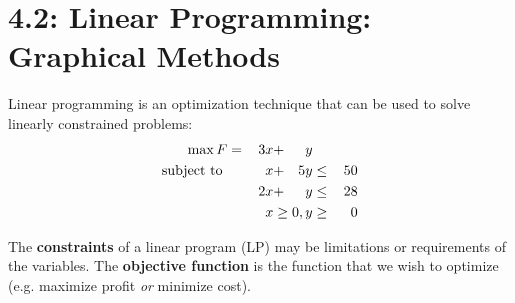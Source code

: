 \documentclass[../mathNotesPreamble]{subfiles}
\begin{document}
  \section{4.2: Linear Programming: Graphical Methods}
    \begin{defn*}
      Linear programming is an optimization technique that can be used to solve linearly constrained problems:
      \begin{alignat*}{4}
        \max F&=&\,3x&+&y\\
        \textnormal{subject to }&& x&+&5y&\leq &\,50\\
          &&2x&+&y&\leq& 28\\
          &&&&\mathllap{x\geq 0}, y&\geq& 0
      \end{alignat*}
      
      The \textbf{constraints} of a linear program (LP) may be limitations or requirements of the variables. The \textbf{objective function} is the function that we wish to optimize (e.g. maximize profit \emph{or} minimize cost).
    \end{defn*}
    
\end{document}
